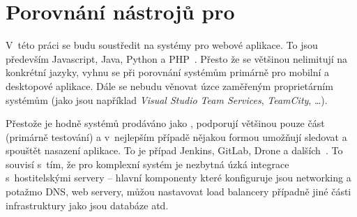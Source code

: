 \chapter{Porovnání nástrojů pro \CICD}
    V~této práci se budu soustředit na systémy pro webové aplikace. To jsou především Javascript, Java, Python a PHP~\cite{github-octoverse-languages}. Přesto že se \CI většinou nelimitují na konkrétní jazyky, vyhnu se při porovnání systémům primárně pro mobilní a desktopové aplikace. Dále se nebudu věnovat úzce zaměřeným proprietárním systémům (jako jsou například \textit{Visual Studio Team Services}, \textit{TeamCity}, \ldots).


    Přestože je hodně systémů prodáváno jako \CICD, podporují většinou pouze \CI část (primárně testování) a v~nejlepším případě nějakou formou umožňují sledovat a spouštět nasazení aplikace. To je případ Jenkins, GitLab, Drone a dalších~\cite{ellingwood-cicd-list}. To souvisí s~tím, že pro komplexní \CD systém je nezbytná úzká integrace s~hostitelskými servery -- hlavní komponenty které \CD konfiguruje jsou networking a potažmo DNS, \HTTP web servery, můžou nastavovat load balancery případně jiné části infrastruktury jako jsou databáze atd.

    

    \newpage
    

    \newpage
    

    \newpage
    

    \newpage
    

    \newpage
    

    \newpage
    

    \newpage
    


    \newpage
    
